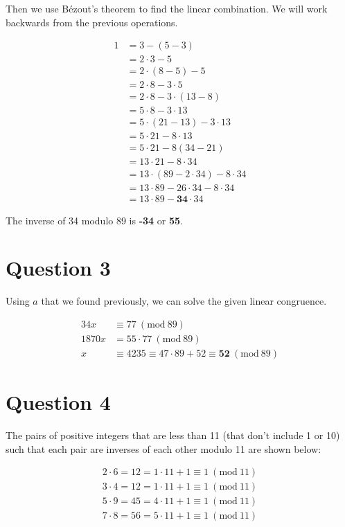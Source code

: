 \documentclass[11pt]{article}
\newcommand{\PMod}[1]{\ (\mathrm{mod}\ #1)}
\begin{document}
Then we use B\'{e}zout's theorem to find the linear combination. We will work backwards from the previous operations.

\begin{align*}
    1 &= 3 - (5 - 3)\\
    &= 2 \cdot 3 - 5\\
    &= 2 \cdot (8 - 5) - 5\\
    &= 2 \cdot 8 - 3 \cdot 5\\
    &= 2 \cdot 8 - 3 \cdot (13 - 8)\\
    &= 5 \cdot 8 - 3 \cdot 13\\
    &= 5 \cdot (21 - 13) - 3 \cdot 13\\
    &= 5 \cdot 21 - 8 \cdot 13\\
    &= 5 \cdot 21 - 8 (34 - 21)\\
    &= 13 \cdot 21 - 8 \cdot 34\\
    &= 13 \cdot (89 - 2 \cdot 34) - 8 \cdot 34\\
    &= 13 \cdot 89 - 26 \cdot 34 - 8 \cdot 34\\
    &= 13 \cdot 89 - \boxed{\mathbf{34}} \cdot 34
\end{align*}

The inverse of 34 modulo 89 is \textbf{-34} or \textbf{55}.

\section*{Question 3}
Using $a$ that we found previously, we can solve the given linear congruence.

\begin{align*}
    34x &\equiv 77 \PMod{89}\\
    1870x &= 55 \cdot 77 \PMod{89}\\
    x &\equiv 4235 \equiv 47 \cdot 89 + 52 \equiv \boxed{\mathbf{52}}\PMod{89}
\end{align*}

\section*{Question 4}
The pairs of positive integers that are less than 11 (that don't include 1 or 10) such that each pair are inverses of each other modulo 11 are shown below:

\begin{align*}
    2 \cdot 6 = 12 = 1\cdot 11 + 1 \equiv 1 \PMod{11} \\
    3 \cdot 4 = 12 = 1 \cdot 11 + 1 \equiv 1 \PMod{11}\\
    5 \cdot 9 = 45 = 4 \cdot 11 + 1 \equiv 1 \PMod{11}\\
    7 \cdot 8 = 56 = 5 \cdot 11 + 1 \equiv 1 \PMod{11}\\
\end{align*}
\end{document}
